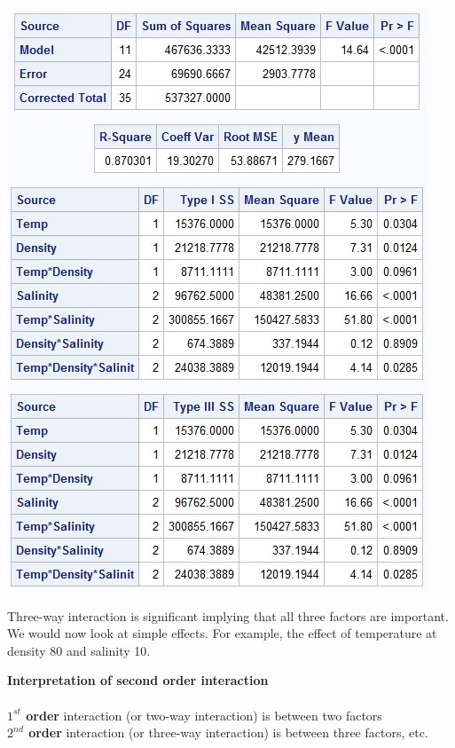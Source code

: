 \begin{center}
\includegraphics[scale=0.7]{Shrimp}
\end{center}

Three-way interaction is significant implying that all three factors are important.  We would now look at simple effects.  For example, the effect of temperature at density 80 and salinity 10.

\newpage

\textbf{Interpretation of second order interaction}\\~\\
\textbf{$1^{st}$ order} interaction (or two-way interaction) is between two factors \\
\textbf{$2^{nd}$ order} interaction (or three-way interaction) is between three factors, etc.\\~\\ 

